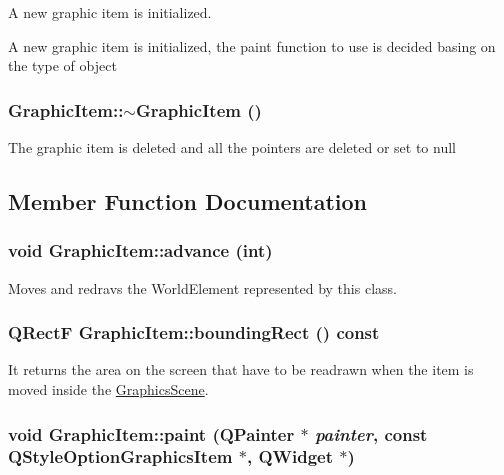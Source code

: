 A new graphic item is initialized. 

A new graphic item is initialized, the paint function to use is decided basing on the type of object \hypertarget{classGraphicItem_aa502ffe9cf1bc733f5d21f14adf31670}{
\subsubsection[{$\sim$GraphicItem}]{\setlength{\rightskip}{0pt plus 5cm}GraphicItem::$\sim$GraphicItem ()}}
\label{classGraphicItem_aa502ffe9cf1bc733f5d21f14adf31670}
The graphic item is deleted and all the pointers are deleted or set to null 

\subsection{Member Function Documentation}
\hypertarget{classGraphicItem_afa2b9d2368564680b1cd7e24ce20de00}{
\subsubsection[{advance}]{\setlength{\rightskip}{0pt plus 5cm}void GraphicItem::advance (int)}}
\label{classGraphicItem_afa2b9d2368564680b1cd7e24ce20de00}
Moves and redravs the WorldElement represented by this class. \hypertarget{classGraphicItem_a28dba31cb866a341260ff96d431ed474}{
\subsubsection[{boundingRect}]{\setlength{\rightskip}{0pt plus 5cm}QRectF GraphicItem::boundingRect () const}}
\label{classGraphicItem_a28dba31cb866a341260ff96d431ed474}
It returns the area on the screen that have to be readrawn when the item is moved inside the \hyperlink{classGraphicsScene}{GraphicsScene}. \hypertarget{classGraphicItem_a0cca6d18934673ed5e132951770b0900}{
\subsubsection[{paint}]{\setlength{\rightskip}{0pt plus 5cm}void GraphicItem::paint (QPainter $\ast$ {\em painter}, \/  const QStyleOptionGraphicsItem $\ast$, \/  QWidget $\ast$)}}
